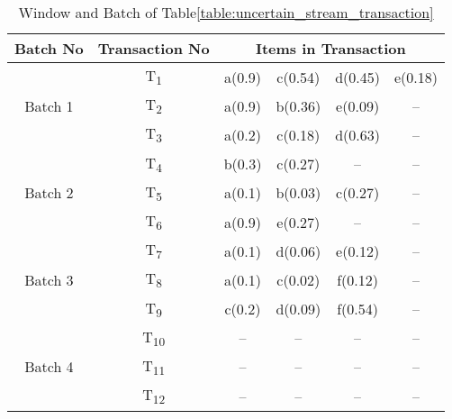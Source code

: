 %
%
\begin{table}
\centering

\begin{tabular}{|c|c|c|c|c|c|}
\hline
	Batch No& Transaction No & \multicolumn{4}{c|}{Items in Transaction} \\ \hline \hline
	\multirow{3}{*}{Batch 1}	&	T\textsubscript{1} & a(0.9) & c(0.54) & d(0.45) & e(0.18)		\\
								&	T\textsubscript{2} & a(0.9) & b(0.36) & e(0.09) & --			\\
								&	T\textsubscript{3} & a(0.2) & c(0.18) & d(0.63) & --			\\\hline
	\multirow{3}{*}{Batch 2}	&	T\textsubscript{4} & b(0.3) & c(0.27) & --  	& --			\\
								&	T\textsubscript{5} & a(0.1) & b(0.03) & c(0.27) & --  			\\
								&	T\textsubscript{6} & a(0.9) & e(0.27) & --	    & --  			\\\hline
	\multirow{3}{*}{Batch 3}	&	T\textsubscript{7} & a(0.1) & d(0.06) & e(0.12) & --			\\
								&	T\textsubscript{8} & a(0.1) & c(0.02) & f(0.12) & --   			\\
								&	T\textsubscript{9} & c(0.2) & d(0.09) & f(0.54) & --   			\\\hline
								
	\multirow{3}{*}{Batch 4}	&	T\textsubscript{10} &  --  &  --  &  --  & --    				\\
								&	T\textsubscript{11} &  --  &  --  &  --  & --    				\\
								&	T\textsubscript{12} &  --  &  --  &  --  & --    				\\\hline
	\end{tabular}
\caption{Window and Batch of Table\ref{table:uncertain_stream_transaction}}
\label{table:prefix_assigned}
\end{table}


%
%